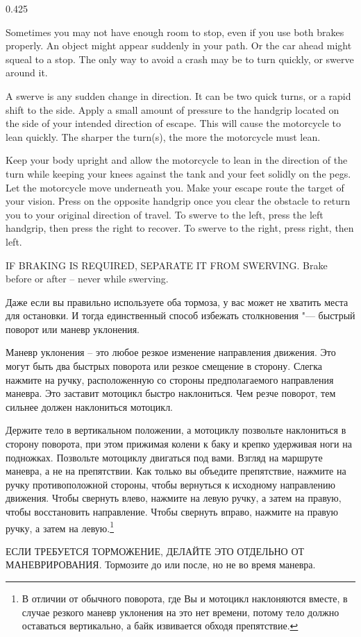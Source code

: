 \begin{langblock}{0.425}
	\begin{eng}
	
	Sometimes you may not have enough room to stop, even if you use both brakes properly. An object might appear suddenly in your path. Or the car ahead might squeal to a stop. The only way to avoid a crash may be to turn quickly, or swerve around it.
	
	A swerve is any sudden change in direction. It can be two quick turns, or a rapid shift to the side. Apply a small amount of pressure to the handgrip located on the side of your intended direction of escape. This will cause the motorcycle to lean quickly. The sharper the turn(s), the more the motorcycle must lean.
	
	Keep your body upright and allow the motorcycle to lean in the direction of the turn while keeping your knees against the tank and your feet solidly on the pegs. Let the motorcycle move underneath you. Make your escape route the target of your vision. Press on the opposite handgrip once you clear the obstacle to return you to your original direction of travel. To swerve to the left, press the left handgrip, then press the right to recover. To swerve to the right, press right, then left.
	
	
	IF BRAKING IS REQUIRED, SEPARATE IT FROM SWERVING.  Brake before or after -- never while swerving.
	\end{eng}
	\begin{rus}
		
		Даже если вы правильно используете оба тормоза, у вас может не хватить места для остановки. 
		И тогда единственный способ избежать столкновения "--- быстрый поворот или маневр уклонения.
		
		Маневр уклонения -- это любое резкое изменение направления движения. Это могут быть два быстрых поворота или резкое смещение в сторону. Слегка нажмите на ручку, расположенную со стороны предполагаемого направления маневра. Это заставит мотоцикл быстро наклониться. Чем резче поворот, тем сильнее должен наклониться мотоцикл.
		
		Держите тело в вертикальном положении, а мотоциклу позвольте наклониться в сторону поворота, при этом прижимая колени к баку и крепко удерживая ноги на подножках. Позвольте мотоциклу двигаться под вами. Взгляд на маршруте маневра, а не на препятствии. Как только вы объедите препятствие, нажмите на ручку противоположной стороны, чтобы вернуться к исходному направлению движения. Чтобы свернуть влево, нажмите на левую ручку, а затем на правую, чтобы восстановить направление. Чтобы свернуть вправо, нажмите на правую ручку, а затем на левую.\footnote{В отличии от обычного поворота, где Вы и мотоцикл наклоняются вместе, в случае резкого маневр уклонения на это нет времени, потому тело должно оставаться вертикально, а байк извивается обходя препятствие.}
		
		
		ЕСЛИ ТРЕБУЕТСЯ ТОРМОЖЕНИЕ, ДЕЛАЙТЕ ЭТО ОТДЕЛЬНО ОТ МАНЕВРИРОВАНИЯ.  Тормозите до или после, но не во время маневра.
\end{rus}
\end{langblock}
